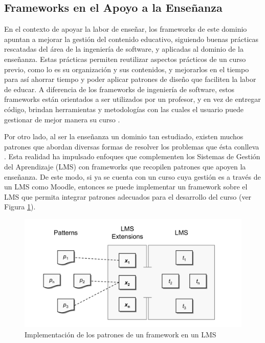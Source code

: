 \documentclass[letterpaper,12pt]{article}
\begin{document}
\subsection{Frameworks en el Apoyo a la Enseñanza}

En el contexto de apoyar la labor de enseñar, los frameworks de este dominio apuntan a mejorar la gestión del contenido educativo, siguiendo buenas prácticas rescatadas del área de la ingeniería de software, y aplicadas al dominio de la enseñanza. Estas prácticas permiten reutilizar aspectos prácticos de un curso previo, como lo es su organización y sus contenidos, y mejorarlos en el tiempo para así ahorrar tiempo y poder aplicar patrones de diseño que faciliten la labor de educar. A diferencia de los frameworks de ingeniería de software, estos frameworks están orientados a ser utilizados por un profesor, y en vez de entregar código, brindan herramientas y metodologías con las cuales el usuario puede gestionar de mejor manera su curso \cite{elearn}.

Por otro lado, al ser la enseñanza un dominio tan estudiado, existen muchos patrones que abordan diversas formas de resolver los problemas que ésta conlleva \cite{elearn}. Esta realidad ha impulsado enfoques que complementen los Sistemas de Gestión del Aprendizaje (LMS) con frameworks que recopilen patrones que apoyen la enseñanza. De este modo, si ya se cuenta con un curso cuya gestión es a través de un LMS como Moodle, entonces se puede implementar un framework sobre el LMS que permita integrar patrones adecuados para el desarrollo del curso (ver Figura \ref{patronlms}).

\begin{figure}[H]
  \centering
  \includegraphics[width=1\textwidth]{patronlms.png}
  \caption{Implementación de los patrones de un framework en un LMS \cite{elearn}}
  \label{patronlms}
\end{figure}
\end{document}
